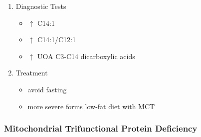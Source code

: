 \documentclass{scrartcl}
\begin{document}
\begin{enumerate}
\item Diagnostic Tests
\label{sec:org9a84dfc}
\begin{itemize}
\item \(\uparrow\) C14:1
\item \(\uparrow\) C14:1/C12:1
\item \(\uparrow\) UOA C3-C14 dicarboxylic acids
\end{itemize}
\item Treatment
\label{sec:orgeb49d82}
\begin{itemize}
\item avoid fasting
\item more severe forms low-fat diet with MCT
\end{itemize}
\end{enumerate}

\subsubsection{Mitochondrial Trifunctional Protein Deficiency}
\label{sec:org223bad7}
\end{document}

